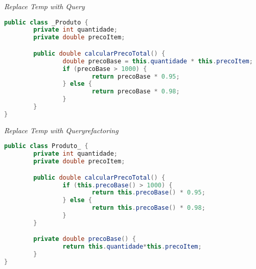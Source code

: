 \begin{frame}[fragile]{\em Replace Temp with Query}
 \begin{lstlisting}[language=java]
public class _Produto {
        private int quantidade;
        private double precoItem;

        public double calcularPrecoTotal() {
                double precoBase = this.quantidade * this.precoItem;
                if (precoBase > 1000) {
                        return precoBase * 0.95;
                } else {
                        return precoBase * 0.98;
                }
        }
}
  \end{lstlisting}
\end{frame}


\begin{frame}[fragile]{\em Replace Temp with Query}{\em\color{red}refactoring}
\color{red}
  \begin{lstlisting}[language=java]
public class Produto_ {
        private int quantidade;
        private double precoItem;

        public double calcularPrecoTotal() {
                if (this.precoBase() > 1000) {
                        return this.precoBase() * 0.95;
                } else {
                        return this.precoBase() * 0.98;
                }
        }

        private double precoBase() {
                return this.quantidade*this.precoItem;
        }
}
  \end{lstlisting}
\end{frame}

